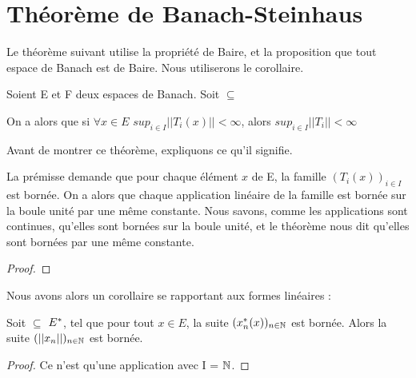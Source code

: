 \chapter{Théorème de Banach-Steinhaus}

Le théorème suivant utilise la propriété de Baire, et la proposition que tout
espace de Banach est de Baire. Nous utiliserons le corollaire.

\begin{theorem} 
	Soient E et F deux espaces de Banach.
	Soit  $\subseteq$ 
	\label{banach-steinhaus}

	On a alors que si $\forall x \in E$ $sup_{i \in I}||T_{i}(x)|| < \infty$,
	alors $sup_{i \in I} ||T_{i}|| < \infty$
\end{theorem}

Avant de montrer ce théorème, expliquons ce qu'il signifie.

La prémisse demande que pour chaque élément $x$ de E, la famille $(T_{i}(x))_{i
\in I}$ est bornée.
On a alors que chaque application linéaire de la famille est bornée sur la
boule unité par une même constante. Nous savons, comme les applications sont
continues, qu'elles sont bornées sur la boule unité, et le théorème nous dit
qu'elles sont bornées par une même constante.

\begin{proof}
	
\end{proof}

Nous avons alors un corollaire se rapportant aux formes linéaires :

\begin{corollary}
	Soit  $\subseteq$ $E^{*}$, tel que pour
	tout $x \in E$, la suite $(x_{n}^{*}(x))_{n \in \mathbb{N}}$ est bornée. Alors
	la suite $(||x_{n}||)_{n \in \mathbb{N}}$ est bornée.
\end{corollary}

\begin{proof}
	Ce n'est qu'une application avec I = $\mathbb{N}$.
\end{proof}
